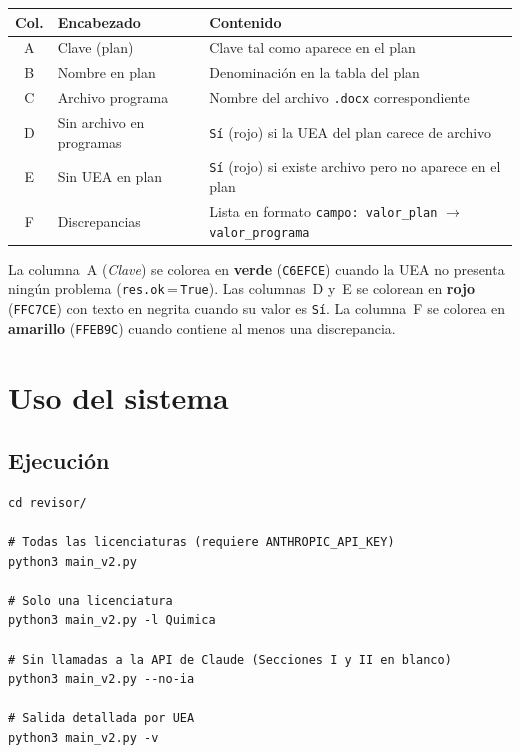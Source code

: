 \documentclass[11pt,a4paper]{article}
\begin{document}
\begin{center}
\begin{tabular}{clp{7.5cm}}
\toprule
\textbf{Col.} & \textbf{Encabezado} & \textbf{Contenido} \\
\midrule
A & Clave (plan)              & Clave tal como aparece en el plan \\
B & Nombre en plan            & Denominación en la tabla del plan \\
C & Archivo programa          & Nombre del archivo \texttt{.docx} correspondiente \\
D & Sin archivo en programas  & \texttt{Sí} (rojo) si la UEA del plan carece de archivo \\
E & Sin UEA en plan           & \texttt{Sí} (rojo) si existe archivo pero no aparece en el plan \\
F & Discrepancias             & Lista en formato
                                \texttt{campo: valor\_plan} $\to$ \texttt{valor\_programa} \\
\bottomrule
\end{tabular}
\end{center}

\begin{notabox}
La columna~A (\textit{Clave}) se colorea en \textbf{verde} (\texttt{C6EFCE})
cuando la UEA no presenta ningún problema (\texttt{res.ok}\,=\,\texttt{True}).
Las columnas~D y~E se colorean en \textbf{rojo} (\texttt{FFC7CE}) con texto en negrita
cuando su valor es \texttt{Sí}.
La columna~F se colorea en \textbf{amarillo} (\texttt{FFEB9C}) cuando contiene
al menos una discrepancia.
\end{notabox}

\section{Uso del sistema}

\subsection{Ejecución}

\begin{lstlisting}[language={}]
cd revisor/

# Todas las licenciaturas (requiere ANTHROPIC_API_KEY)
python3 main_v2.py

# Solo una licenciatura
python3 main_v2.py -l Quimica

# Sin llamadas a la API de Claude (Secciones I y II en blanco)
python3 main_v2.py --no-ia

# Salida detallada por UEA
python3 main_v2.py -v
\end{lstlisting}
\end{document}
